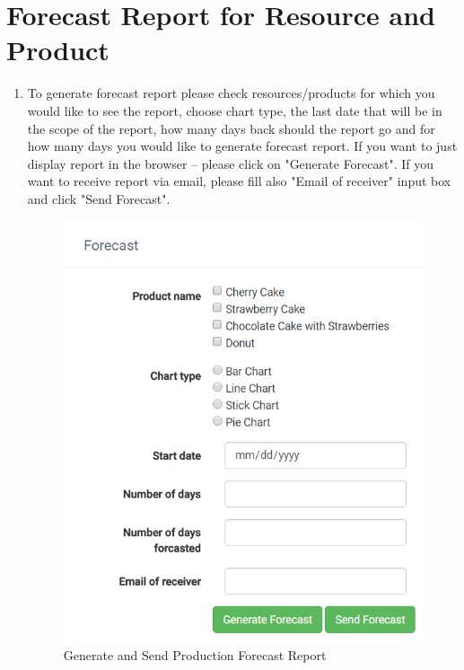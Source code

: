 \documentclass[a4paper,11pt,twoside]{report}
\theoremstyle{definition}
\begin{document}
\section{Forecast Report for Resource and Product}
\begin{enumerate}
\item To generate forecast report please check resources/products for which you would like to see the report, choose chart type, the last date that will be in the scope of the report, how many days back should the report go and for how many days you would like to generate forecast report. If you want to just display report in the browser – please click on "Generate Forecast". If you want to receive report via email, please fill also "Email of receiver" input box and click "Send Forecast".

\begin{figure}[h!]
\begin{center}
\includegraphics[scale = 1]{AS/report/2}
\end{center}
\caption{Generate and Send Production Forecast Report}
\end{figure}
\thispagestyle{empty}


\end{enumerate}
\end{document}
